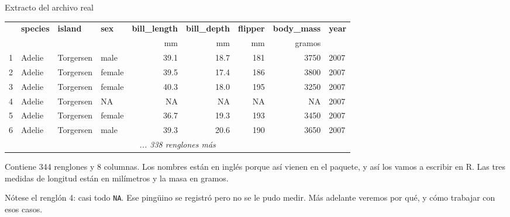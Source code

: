 \documentclass[aspectratio=169,10pt]{beamer}
\newcommand{\destaca}[1]{%
  \par\vspace{3pt}\noindent
  \colorbox{azulClaro}{%
    \parbox{\dimexpr\linewidth-2\fboxsep\relax}{\vspace{3pt}#1\vspace{3pt}}}%
  \par\vspace{3pt}}
\begin{document}
\begin{frame}{Extracto del archivo real}
  \centering
  {\scriptsize
  \begin{tabular}{@{}rlllrrrrl@{}}
    \toprule
    & \textbf{species} & \textbf{island} & \textbf{sex} & \textbf{bill\_length} & \textbf{bill\_depth} & \textbf{flipper} & \textbf{body\_mass} & \textbf{year} \\
    & & & & {\tiny\color{grisT}mm} & {\tiny\color{grisT}mm} & {\tiny\color{grisT}mm} & {\tiny\color{grisT}gramos} & \\
    \midrule
    1 & Adelie & Torgersen & male   & 39.1 & 18.7 & 181 & 3750 & 2007 \\
    2 & Adelie & Torgersen & female & 39.5 & 17.4 & 186 & 3800 & 2007 \\
    3 & Adelie & Torgersen & female & 40.3 & 18.0 & 195 & 3250 & 2007 \\
    4 & Adelie & Torgersen & \textcolor{rojoAc}{NA} & \textcolor{rojoAc}{NA} & \textcolor{rojoAc}{NA} & \textcolor{rojoAc}{NA} & \textcolor{rojoAc}{NA} & 2007 \\
    5 & Adelie & Torgersen & female & 36.7 & 19.3 & 193 & 3450 & 2007 \\
    6 & Adelie & Torgersen & male   & 39.3 & 20.6 & 190 & 3650 & 2007 \\
    \multicolumn{9}{c}{\textcolor{grisT}{\textit{... 338 renglones más}}} \\
    \bottomrule
  \end{tabular}}

  \vspace{0.45cm}
  \raggedright
  \destaca{Contiene 344 renglones y 8 columnas. Los nombres están en inglés porque así vienen
  en el paquete, y así los vamos a escribir en R. Las tres medidas de longitud están en
  milímetros y la masa en gramos.

  \vspace{0.2cm}
  Nótese el renglón 4: casi todo \textcolor{rojoAc}{\texttt{NA}}. Ese pingüino se registró
  pero no se le pudo medir. Más adelante veremos por qué, y cómo trabajar con esos casos.}
\end{frame}
\end{document}
